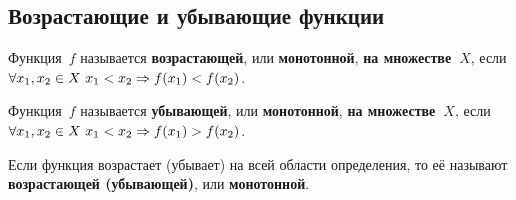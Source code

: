 \subsection{Возрастающие и убывающие функции}
 Функция~$f$ называется \textbf{возрастающей}, или \textbf{монотонной}, \textbf{на множестве~$X$}, если $\forall x_1, x_2 \in X \ x_1 \opbr< x_2 \opbr\Rightarrow f(x_1) \opbr< f(x_2)$.

 Функция~$f$ называется \textbf{убывающей}, или \textbf{монотонной}, \textbf{на множестве~$X$}, если $\forall x_1, x_2 \in X \ x_1 \opbr< x_2 \opbr\Rightarrow f(x_1) \opbr> f(x_2)$.

Если функция возрастает (убывает) на всей области определения, то её называют \textbf{возрастающей (убывающей)}, или \textbf{монотонной}.

